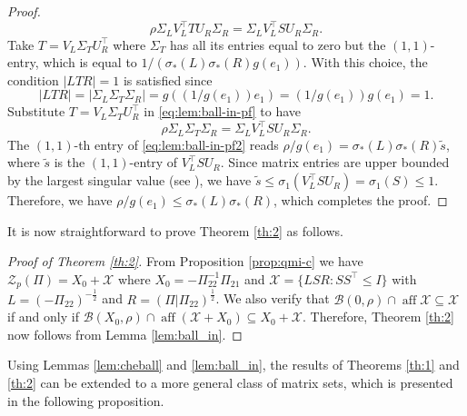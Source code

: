 \documentclass[pdflatex,sn-mathphys-num]{sn-jnl}%
\DeclareMathOperator{\aff}{aff}
\newcommand{\norm}[1]{\left|#1\right|}
\theoremstyle{thmstyleone}
\begin{document}
\begin{proof}
\begin{equation}
\label{eq:lem:ball-in-pf}
\rho \Sigma_LV_L^\top TU_R\Sigma_R =\Sigma_LV_L^\top S U_R\Sigma_R.
\end{equation}
Take $T=V_L\Sigma_T U_R^\top$ where $\Sigma_T$ has all its entries equal to zero but the $(1,1)$-entry, which is equal to $1/(\sigma_*(L)\sigma_*(R)g(e_1))$. With this choice, the condition $\norm{LTR}=1$ is satisfied since 
\begin{equation}
\norm{LTR}=\norm{\Sigma_L \Sigma_T\Sigma_R}=g((1/g(e_1))e_1)=(1/g(e_1))g(e_1)=1.
\end{equation}
Substitute 
$T=V_L\Sigma_T U_R^\top$ in \eqref{eq:lem:ball-in-pf} to have
\begin{equation}
\label{eq:lem:ball-in-pf2}
\rho \Sigma_L\Sigma_T\Sigma_R =\Sigma_LV_L^\top S U_R\Sigma_R.
\end{equation}
The $(1,1)$-th entry of \eqref{eq:lem:ball-in-pf2} reads 
$\rho/g(e_1) =\sigma_*(L)\sigma_*(R)\tilde{s}$, where $\tilde{s}$ is the $(1,1)$-entry of $V_L^\top S U_R$. Since matrix entries are upper bounded by the largest singular value (see \cite[Fact 11.9.23(xii)]{bernstein2018scalar}), we have $\tilde{s}\leq \sigma_1(V_L^\top S U_R)=\sigma_1(S)\leq 1$. Therefore, we have \mbox{$\rho/g(e_1) \leq\sigma_*(L)\sigma_*(R)$}, which completes the proof. 
\end{proof}

It is now straightforward to prove Theorem \ref{th:2} as follows.

\begin{proof}[Proof of Theorem \ref{th:2}]
From Proposition \ref{prop:qmi-c} we have $\mathcal{Z}_{p}(\Pi)=X_0+\mathcal{X}$ where $X_0=-\Pi_{22}^{-1} \Pi_{21}$ and $\mathcal{X}=\{LSR:SS^\top\leq I\}$ with $L=(-\Pi_{22})^{-\frac{1}{2}}$ and $R=(\Pi|\Pi_{22})^{\frac{1}{2}}$. We also verify that $\mathcal{B}(0,\rho)\cap\aff\mathcal{X}\subseteq \mathcal{X}$ if and only if $\mathcal{B}(X_0,\rho)\cap\aff(\mathcal{X}+X_0)\subseteq X_0+\mathcal{X}$.  Therefore, Theorem \ref{th:2}
now follows from Lemma \ref{lem:ball_in}. 
\end{proof}

Using Lemmas \ref{lem:cheball} and \ref{lem:ball_in}, the results of Theorems \ref{th:1} and \ref{th:2} can be extended to a more general class of matrix sets, which is presented in the following proposition.
\end{document}

